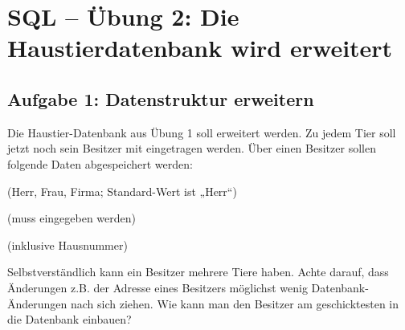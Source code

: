 \clearpage

\section{SQL -- Übung 2: Die Haustierdatenbank wird erweitert}

\subsection{Aufgabe 1: Datenstruktur erweitern}

Die Haustier-Datenbank aus Übung 1 soll erweitert werden. Zu jedem Tier soll
jetzt noch sein Besitzer mit eingetragen werden. Über einen Besitzer sollen
folgende Daten abgespeichert werden:

\begin{compactitem}
  \item {} (Herr, Frau, Firma; Standard-Wert ist „Herr“)
  \item {}
  \item {} (muss eingegeben werden)
  \item {} (inklusive Hausnummer)
  \item {}
  \item {}
  \item {}
\end{compactitem}

Selbstverständlich kann ein Besitzer mehrere Tiere haben. Achte darauf, dass
Änderungen z.B. der Adresse eines Besitzers möglichst wenig Datenbank-Änderungen
nach sich ziehen. Wie kann man den Besitzer am geschicktesten in die Datenbank
einbauen?
